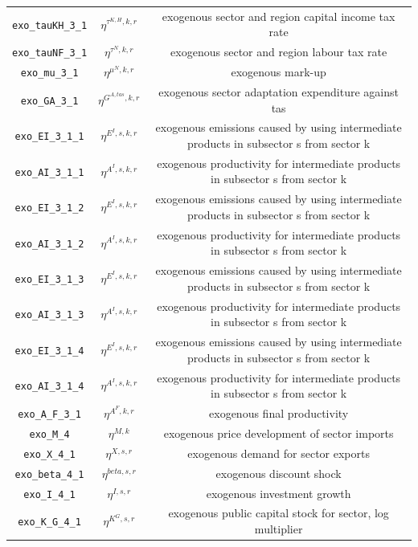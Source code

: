 \begin{center}
\begin{longtable}{ccc}
\texttt{exo\_tauKH\_3\_1} & ${\eta^{\tau^{K,H},k,r}}$ & exogenous sector and region capital income tax rate\\
\texttt{exo\_tauNF\_3\_1} & ${\eta^{\tau^{N},k,r}}$ & exogenous sector and region labour tax rate\\
\texttt{exo\_mu\_3\_1} & ${\eta^{\mu^{N},k,r}}$ & exogenous mark-up\\
\texttt{exo\_GA\_3\_1} & ${\eta^{G^{A,tas},k,r}}$ & exogenous sector adaptation expenditure against tas\\
\texttt{exo\_EI\_3\_1\_1} & ${\eta^{E^{I},s,k,r}}$ & exogenous emissions caused by using intermediate products in subsector s from sector k\\
\texttt{exo\_AI\_3\_1\_1} & ${\eta^{A^{I},s,k,r}}$ & exogenous productivity for intermediate products in subsector s from sector k\\
\texttt{exo\_EI\_3\_1\_2} & ${\eta^{E^{I},s,k,r}}$ & exogenous emissions caused by using intermediate products in subsector s from sector k\\
\texttt{exo\_AI\_3\_1\_2} & ${\eta^{A^{I},s,k,r}}$ & exogenous productivity for intermediate products in subsector s from sector k\\
\texttt{exo\_EI\_3\_1\_3} & ${\eta^{E^{I},s,k,r}}$ & exogenous emissions caused by using intermediate products in subsector s from sector k\\
\texttt{exo\_AI\_3\_1\_3} & ${\eta^{A^{I},s,k,r}}$ & exogenous productivity for intermediate products in subsector s from sector k\\
\texttt{exo\_EI\_3\_1\_4} & ${\eta^{E^{I},s,k,r}}$ & exogenous emissions caused by using intermediate products in subsector s from sector k\\
\texttt{exo\_AI\_3\_1\_4} & ${\eta^{A^{I},s,k,r}}$ & exogenous productivity for intermediate products in subsector s from sector k\\
\texttt{exo\_A\_F\_3\_1} & ${\eta^{A^F,k,r}}$ & exogenous final productivity\\
\texttt{exo\_M\_4} & ${\eta^{M,k}}$ & exogenous price development of sector imports\\
\texttt{exo\_X\_4\_1} & ${\eta^{X,s,r}}$ & exogenous demand for sector exports\\
\texttt{exo\_beta\_4\_1} & ${\eta^{beta,s,r}}$ & exogenous discount shock\\
\texttt{exo\_I\_4\_1} & ${\eta^{I,s,r}}$ & exogenous investment growth\\
\texttt{exo\_K\_G\_4\_1} & ${\eta^{K^G,s,r}}$ & exogenous public capital stock for sector, log multiplier\\

\end{longtable}
\end{center}

